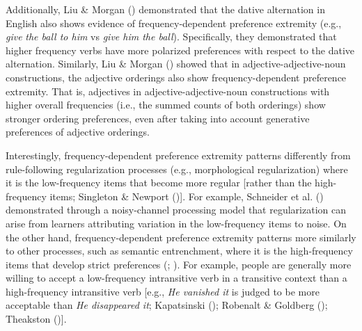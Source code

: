\documentclass[
  12pt,
  letterpaper,
]{scrreprt}
\begin{document}
Additionally, Liu \& Morgan
()
demonstrated that the dative alternation in English also shows evidence
of frequency-dependent preference extremity (e.g., \emph{give}
\emph{the ball to him} vs \emph{give him the ball}). Specifically, they
demonstrated that higher frequency verbs have more polarized preferences
with respect to the dative alternation. Similarly, Liu \& Morgan
()
showed that in adjective-adjective-noun constructions, the adjective
orderings also show frequency-dependent preference extremity. That is,
adjectives in adjective-adjective-noun constructions with higher overall
frequencies (i.e., the summed counts of both orderings) show stronger
ordering preferences, even after taking into account generative
preferences of adjective orderings.

Interestingly, frequency-dependent preference extremity patterns
differently from rule-following regularization processes (e.g.,
morphological regularization) where it is the low-frequency items that
become more regular {[}rather than the high-frequency items; Singleton
\& Newport (){]}.
For example, Schneider et al.
() demonstrated
through a noisy-channel processing model that regularization can arise
from learners attributing variation in the low-frequency items to noise.
On the other hand, frequency-dependent preference extremity patterns
more similarly to other processes, such as semantic entrenchment, where
it is the high-frequency items that develop strict preferences
(;
).
For example, people are generally more willing to accept a low-frequency
intransitive verb in a transitive context than a high-frequency
intransitive verb {[}e.g., \emph{He vanished it} is judged to be more
acceptable than \emph{He disappeared it}; Kapatsinski
(); Robenalt \& Goldberg
();
Theakston
(){]}.
\end{document}
